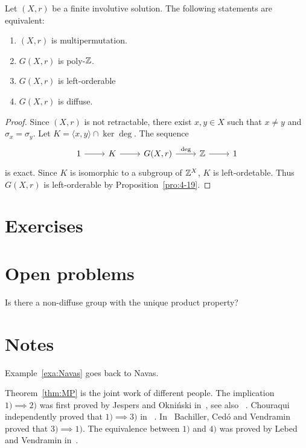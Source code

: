 \begin{theorem}
\label{thm:MP}
	Let $(X,r)$ be a finite involutive solution. The following statements are equivalent:
	\begin{enumerate}
		\item $(X,r)$ is multipermutation. 
		\item $G(X,r)$ is poly-$\mathbb{Z}$.
		\item $G(X,r)$ is left-orderable
		\item $G(X,r)$ is diffuse.
	\end{enumerate}	
\end{theorem}

\begin{proof}
Since $(X,r)$ is not retractable, there exist $x,y\in X$ such that $x\ne y$ and 
$\sigma_x=\sigma_y$. Let $K=\langle x,y\rangle\cap\ker\deg$. The sequence
\[
	\begin{tikzcd}
	1 & K & G(X,r) & \Z & 1
	\arrow[from=1-1, to=1-2]
	\arrow[from=1-2, to=1-3]
	\arrow["\deg", from=1-3, to=1-4]
	\arrow[from=1-4, to=1-5]
\end{tikzcd}
\]
is exact. Since $K$ is isomorphic to a subgroup of $\mathbb{Z}^{X}$, $K$ is left-ordetable. Thus $G(X,r)$ 
is left-orderable by Proposition~\ref{pro:4-19}.
\end{proof} 

\section*{Exercises}




\section*{Open problems}

\begin{problem}[?]
	Is there a non-diffuse group with the unique product property? 	
\end{problem}

\section*{Notes}

Example~\ref{exa:Navas} goes back to Navas. 

Theorem~\ref{thm:MP} is the joint work of different people. 
The implication $1)\implies 2)$ was first proved by Jespers and Okni\'nski in~\cite{}, see also
~\cite{MR2301033}. Chouraqui independently proved
that $1)\implies 3)$ in ~\cite{MR3572046}. In~\cite{MR3815290} Bachiller, Ced\'o and Vendramin proved that $3)\implies 1)$. The equivalence between
$1)$ and $4)$ was proved by Lebed and Vendramin in~\cite{MR3974961}.


